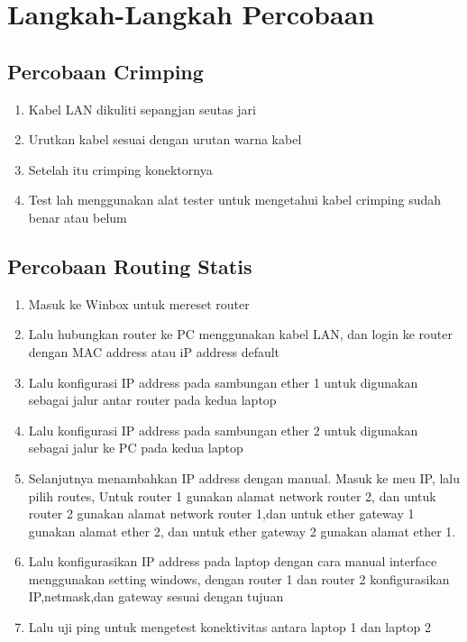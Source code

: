 \section{Langkah-Langkah Percobaan}

\subsection{Percobaan Crimping}
\begin{enumerate}
	\item Kabel LAN dikuliti sepangjan seutas jari
	\item Urutkan kabel sesuai dengan urutan warna kabel
	\item Setelah itu crimping konektornya
	\item Test lah menggunakan alat tester untuk mengetahui kabel crimping sudah benar atau belum  
\end{enumerate}

\subsection{Percobaan Routing Statis}
\begin{enumerate}
    \item Masuk ke Winbox untuk mereset router
    \item Lalu hubungkan router ke PC menggunakan kabel LAN, dan login ke router dengan MAC address
    atau iP address default
    \item Lalu konfigurasi IP address pada sambungan ether 1 untuk digunakan sebagai jalur antar router pada kedua laptop
    \item Lalu konfigurasi IP address pada sambungan ether 2 untuk digunakan sebagai jalur ke PC pada kedua laptop
    \item Selanjutnya menambahkan IP address dengan manual. Masuk ke meu IP, lalu pilih routes, Untuk router 1 
    gunakan alamat network router 2, dan untuk router 2 gunakan alamat network router 1,dan untuk 
    ether gateway 1 gunakan alamat ether 2, dan untuk ether gateway 2 gunakan alamat ether 1.
    \item Lalu konfigurasikan IP address pada laptop dengan cara manual interface menggunakan setting
    windows, dengan router 1 dan router 2 konfigurasikan IP,netmask,dan gateway sesuai dengan tujuan
    \item Lalu uji ping untuk mengetest konektivitas antara laptop 1 dan laptop 2  
\end{enumerate}



